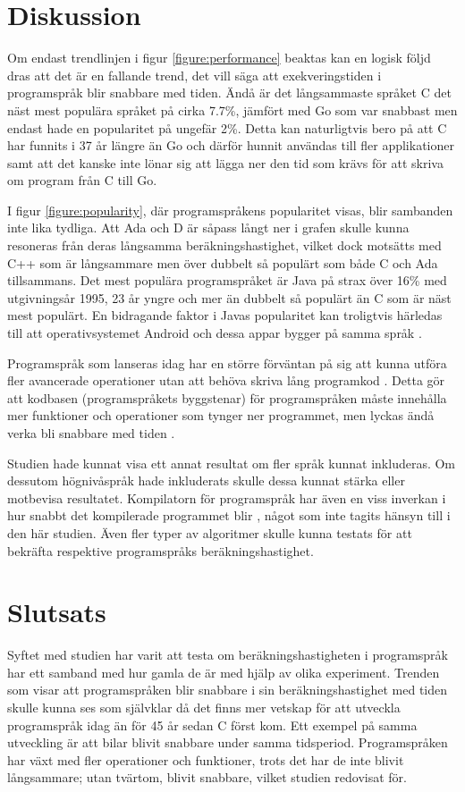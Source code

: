 \documentclass[12pt,swedish]{article}
\begin{document}
\section{Diskussion}
Om endast trendlinjen i figur \ref{figure:performance} beaktas kan en logisk följd dras att det är en fallande trend, det vill säga att exekveringstiden i programspråk blir snabbare med tiden. Ändå är det långsammaste språket C det näst mest populära språket på cirka 7.7\%, jämfört med Go som var snabbast men endast hade en popularitet på ungefär 2\%. Detta kan naturligtvis bero på att C har funnits i 37 år längre än Go och därför hunnit användas till fler applikationer samt att det kanske inte lönar sig att lägga ner den tid som krävs för att skriva om program från C till Go.

I figur \ref{figure:popularity}, där programspråkens popularitet visas, blir sambanden inte lika tydliga. Att Ada och D är såpass långt ner i grafen skulle kunna resoneras från deras långsamma beräkningshastighet, vilket dock motsätts med C++ som är långsammare men över dubbelt så populärt som både C och Ada tillsammans. Det mest populära programspråket är Java på strax över 16\% med utgivningsår 1995, 23 år yngre och mer än dubbelt så populärt än C som är näst mest populärt. En bidragande faktor i Javas popularitet kan troligtvis härledas till att operativsystemet Android och dessa appar bygger på samma språk \citep{gruman_2017}.

Programspråk som lanseras idag har en större förväntan på sig att kunna utföra fler avancerade operationer utan att behöva skriva lång programkod \citep{stroustrup_1997}. Detta gör att kodbasen (programspråkets byggstenar) för programspråken måste innehålla mer funktioner och operationer som tynger ner programmet, men lyckas ändå verka bli snabbare med tiden \citep{luong_2017}.

Studien hade kunnat visa ett annat resultat om fler språk kunnat inkluderas. Om dessutom högnivåspråk hade inkluderats skulle dessa kunnat stärka eller motbevisa resultatet. Kompilatorn för programspråk har även en viss inverkan i hur snabbt det kompilerade programmet blir \citep{srikant_shankar_2008}, något som inte tagits hänsyn till i den här studien. Även fler typer av algoritmer skulle kunna testats för att bekräfta respektive programspråks beräkningshastighet.


\section{Slutsats}
Syftet med studien har varit att testa om beräkningshastigheten i programspråk har ett samband med hur gamla de är med hjälp av olika experiment. Trenden som visar att programspråken blir snabbare i sin beräkningshastighet med tiden skulle kunna ses som självklar då det finns mer vetskap för att utveckla programspråk idag än för 45 år sedan C först kom. Ett exempel på samma utveckling är att bilar blivit snabbare under samma tidsperiod. Programspråken har växt med fler operationer och funktioner, trots det har de inte blivit långsammare; utan tvärtom, blivit snabbare, vilket studien redovisat för.
\end{document}
